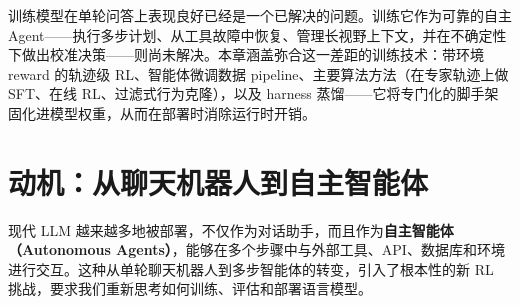 训练模型在单轮问答上表现良好已经是一个已解决的问题。训练它作为可靠的自主 Agent——执行多步计划、从工具故障中恢复、管理长视野上下文，并在不确定性下做出校准决策——则尚未解决。本章涵盖弥合这一差距的训练技术：带环境 reward 的轨迹级 RL、智能体微调数据 pipeline、主要算法方法（在专家轨迹上做 SFT、在线 RL、过滤式行为克隆），以及 harness 蒸馏——它将专门化的脚手架固化进模型权重，从而在部署时消除运行时开销。

\section{动机：从聊天机器人到自主智能体}
\label{motivation-from-chatbots-to-autonomous-agents}

现代 LLM 越来越多地被部署，不仅作为对话助手，而且作为\textbf{自主智能体（Autonomous Agents）}，能够在多个步骤中与外部工具、API、数据库和环境进行交互。这种从单轮聊天机器人到多步智能体的转变，引入了根本性的新 RL 挑战，要求我们重新思考如何训练、评估和部署语言模型。

